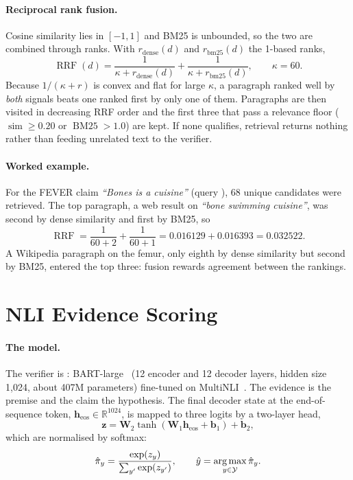 \paragraph{Reciprocal rank fusion.} Cosine similarity lies in $[-1,1]$ and BM25 is unbounded, so the two are combined through ranks. With $r_{\text{dense}}(d)$ and $r_{\text{bm25}}(d)$ the 1-based ranks,
\begin{equation}
  \operatorname{RRF}(d) = \frac{1}{\kappa + r_{\text{dense}}(d)} + \frac{1}{\kappa + r_{\text{bm25}}(d)}, \qquad \kappa = 60.
\end{equation}
Because $1/(\kappa + r)$ is convex and flat for large $\kappa$, a paragraph ranked well by \emph{both} signals beats one ranked first by only one of them. Paragraphs are then visited in decreasing RRF order and the first three that pass a relevance floor ($\operatorname{sim} \ge 0.20$ or $\operatorname{BM25} > 1.0$) are kept. If none qualifies, retrieval returns nothing rather than feeding unrelated text to the verifier.

\paragraph{Worked example.} For the FEVER claim \emph{``Bones is a cuisine''} (query \code{["Bones"]}), 68 unique candidates were retrieved. The top paragraph, a web result on \emph{``bone swimming cuisine''}, was second by dense similarity and first by BM25, so
\[
  \operatorname{RRF} = \frac{1}{60 + 2} + \frac{1}{60 + 1} = 0.016129 + 0.016393 = 0.032522.
\]
A Wikipedia paragraph on the femur, only eighth by dense similarity but second by BM25, entered the top three: fusion rewards agreement between the rankings.

\section{NLI Evidence Scoring}
\label{sec:nli}

\paragraph{The model.} The verifier is : BART-large~\citep{lewis2020bart} (12 encoder and 12 decoder layers, hidden size 1{,}024, about 407M parameters) fine-tuned on MultiNLI~\citep{williams2018mnli}. The evidence is the premise and the claim the hypothesis. The final decoder state at the end-of-sequence token, $\mathbf{h}_{\text{eos}} \in \mathbb{R}^{1024}$, is mapped to three logits by a two-layer head,
\begin{equation}
  \mathbf{z} = \mathbf{W}_2 \tanh(\mathbf{W}_1 \mathbf{h}_{\text{eos}} + \mathbf{b}_1) + \mathbf{b}_2,
\end{equation}
which are normalised by softmax:
\begin{equation}
  \hat{\pi}_y = \frac{\exp(z_y)}{\sum_{y'} \exp(z_{y'})}, \qquad \hat{y} = \operatorname*{arg\,max}_{y \in \mathcal{Y}} \hat{\pi}_y.
\end{equation}

